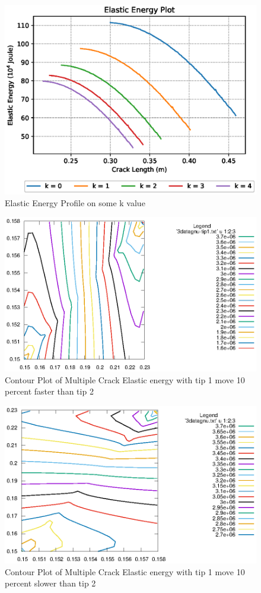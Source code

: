 \documentclass[a4paper,11pt]{article}
\begin{document}
\begin{figure}[h]
	\centering
	\includegraphics[width=0.7\linewidth]{picture/conference/multicrack-elastic-k}
	\caption{Elastic Energy Profile on some k value}
	\label{fig:multicrack-elastic-k}
\end{figure}
\begin{figure}[h]
	\centering
	\includegraphics[width=0.7\linewidth]{picture/conference/elasticdouble-tip1}
	\caption{Contour Plot of Multiple Crack Elastic energy with tip 1 move 10 percent faster than tip 2}
	\label{fig:elasticdouble-tip1}
\end{figure}
\begin{figure}[h]
	\centering
	\includegraphics[width=0.7\linewidth]{picture/conference/elasticdouble-tip2}
	\caption{Contour Plot of Multiple Crack Elastic energy with tip 1 move 10 percent slower than tip 2}
	\label{fig:elasticdouble-tip2}
\end{figure}
\end{document}
